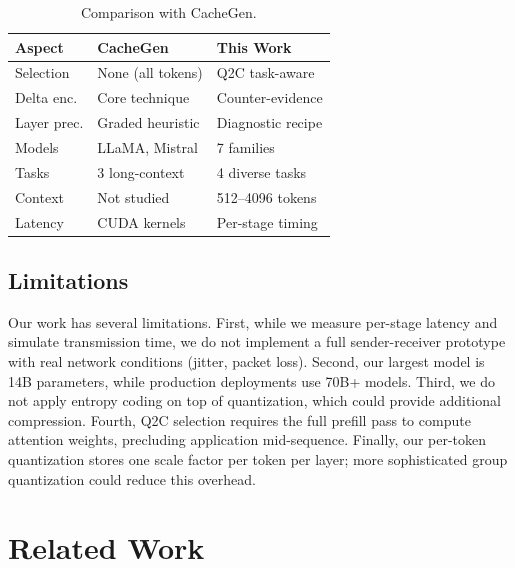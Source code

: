 \documentclass[conference]{IEEEtran}
\newcommand{\QtoC}{\textsc{Q2C}\xspace}
\begin{document}
\begin{table}[t]
\centering
\caption{Comparison with CacheGen.}
\label{tab:vs_cachegen}
\small
\begin{tabular}{@{}p{1.6cm}p{2.8cm}p{2.8cm}@{}}
\toprule
\textbf{Aspect} & \textbf{CacheGen} & \textbf{This Work} \\
\midrule
Selection    & None (all tokens) & \QtoC task-aware \\
Delta enc.   & Core technique    & Counter-evidence \\
Layer prec.  & Graded heuristic  & Diagnostic recipe \\
Models       & LLaMA, Mistral    & 7 families \\
Tasks        & 3 long-context    & 4 diverse tasks \\
Context      & Not studied       & 512--4096 tokens \\
Latency      & CUDA kernels      & Per-stage timing \\
\bottomrule
\end{tabular}
\end{table}

\subsection{Limitations}

Our work has several limitations.
First, while we measure per-stage latency and simulate transmission time, we do not implement a full sender-receiver prototype with real network conditions (jitter, packet loss).
Second, our largest model is 14B parameters, while production deployments use 70B+ models.
Third, we do not apply entropy coding on top of quantization, which could provide additional compression.
Fourth, \QtoC selection requires the full prefill pass to compute attention weights, precluding application mid-sequence.
Finally, our per-token quantization stores one scale factor per token per layer; more sophisticated group quantization could reduce this overhead.

\section{Related Work}
\label{sec:related}
\end{document}
